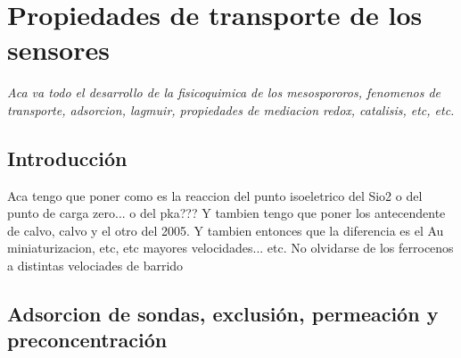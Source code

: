  \newcommand{\NoBiblioEQ}[1]{
 \ifthenelse{\equal{#1}{verdadero}}{}{}
 \NoBiblioEQ{verdadero}}


 \FormatoCapituloDosLineas
 
 \chapter{Propiedades de transporte de los sensores}
 \label{chap:Electroquimica}

 \thispagestyle{empty}
	
 \noindent\textit{Aca va todo el desarrollo de la fisicoquimica de los mesospororos, fenomenos de  transporte, adsorcion, lagmuir, propiedades de mediacion redox, catalisis, etc, etc.}

 \vfill
 \minitoc
 \newpage

\section{Introducción}

	Aca tengo que poner como es la reaccion del punto isoeletrico del Sio2 o del punto de carga zero... o del pka??? Y tambien tengo que poner los antecendente de calvo, calvo y el otro del 2005. Y tambien entonces que la diferencia es el Au miniaturizacion, etc, etc mayores velocidades... etc. 
	No olvidarse de los ferrocenos a distintas velociades de barrido

\section{Adsorcion de sondas, exclusión, permeación y preconcentración}

